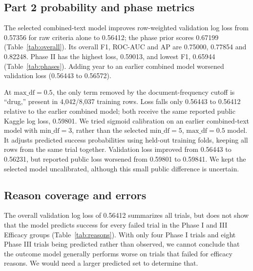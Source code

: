 \documentclass[10pt,twocolumn,letterpaper]{article}
\begin{document}
\subsection{Part 2 probability and phase metrics}
The selected combined-text model improves row-weighted validation log loss
from 0.57356 for raw criteria alone to 0.56412; the phase prior scores
0.67199 (Table~\ref{tab:overall}). Its overall F1, ROC-AUC and AP are
0.75000, 0.77854 and 0.82248. Phase II has the highest loss, 0.59013, and
lowest F1, 0.65944 (Table~\ref{tab:phases}). Adding year to an earlier combined
model worsened validation loss (0.56443 to 0.56572).

At $\mathrm{max\_df}=0.5$, the only term removed by the document-frequency
cutoff is ``drug,'' present in 4,042/8,037 training rows. Loss falls only
0.56443 to 0.56412 relative to the earlier combined model; both receive
the same reported public Kaggle log loss, 0.59801. We tried sigmoid calibration
on an earlier combined-text model with $\mathrm{min\_df}=3$, rather than the
selected $\mathrm{min\_df}=5$, $\mathrm{max\_df}=0.5$ model. It adjusts predicted
success probabilities using held-out training folds, keeping all rows from the
same trial together. Validation loss improved from 0.56443 to 0.56231, but
reported public loss worsened from 0.59801 to 0.59841. We kept the selected
model uncalibrated, although this small public difference is uncertain.
\begin{table}[t]
\centering\small\setlength{\tabcolsep}{3pt}
\caption{Part 2 overall validation metrics; lower log loss is better. ROC denotes
ROC-AUC; AP is average precision.}
\label{tab:overall}
\end{table}
\begin{table}[t]
\centering\small\setlength{\tabcolsep}{3pt}
\caption{Selected uncalibrated model by phase on validation; F1 uses 0.5.}
\label{tab:phases}
\end{table}

\subsection{Reason coverage and errors}
\begin{table}[t]
\centering\small\setlength{\tabcolsep}{3pt}
\caption{Selected model's validation false successes among failed trials.
T/P: observed/predicted reason counts. No record means no Part 1 match;
groups overlap, and -- denotes an empty group.}
\label{tab:reasons}
\end{table}
The overall validation log loss of 0.56412 summarizes all trials, but does not show that
the model predicts success for every failed trial in the Phase I and III
Efficacy groups (Table~\ref{tab:reasons}). With only four Phase I trials and
eight Phase III trials being predicted rather than observed, we cannot conclude that the
outcome model generally performs worse on trials that failed for efficacy reasons.
We would need a larger predicted set to determine that.
\end{document}
